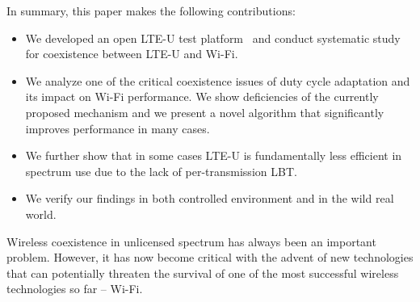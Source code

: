 In summary, this paper makes the following contributions:
\begin{itemize}
\item We developed an open LTE-U test platform~\cite{OpenLTEU} and conduct systematic study for coexistence between LTE-U and Wi-Fi. 
\item We analyze one of the critical coexistence issues of duty cycle adaptation and its impact on Wi-Fi performance. We show deficiencies of the currently proposed mechanism and we present a novel algorithm that significantly improves performance in many cases. 
\item We further show that in some cases LTE-U is fundamentally less efficient in spectrum use due to the lack of per-transmission LBT.  
\item We verify our findings in both controlled environment and in the wild real world.
\end{itemize} 
Wireless coexistence in unlicensed spectrum has always been an important problem.
However, it has now become critical with the advent of new technologies that can potentially threaten the survival of one of the most successful wireless technologies so far -- Wi-Fi. 










